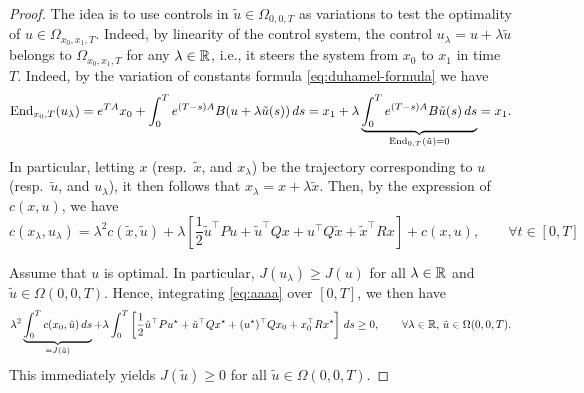 \begin{proof}
    The idea is to use controls in $\tilde u \in \Omega_{0,0,T}$ as variations to test the optimality of $u\in \Omega_{x_0,x_1,T}$.
    Indeed, by linearity of the control system, the control $u_\lambda = u + \lambda \tilde u$ belongs to $\Omega_{x_0,x_1,T}$ for any $\lambda\in \mathbb{R}$, i.e., it steers the system from $x_0$ to $x_1$ in time $T$.
    Indeed, by the variation of constants formula \eqref{eq:duhamel-formula} we have
    \begin{equation}
        \operatorname{End}_{x_0,T}(u_\lambda) = e^{TA}x_0 + \int_0^T e^{(T-s)A}B(u + \lambda \tilde u(s))\, ds = x_1 + \lambda \underbrace{\int_0^T e^{(T-s)A}B\tilde u(s)\, ds}_{\operatorname{End}_{0,T}(\tilde u)=0} = x_1.
    \end{equation}
    In particular, letting $x$ (resp.~$\tilde x$, and $x_\lambda$) be the trajectory corresponding to $u$ (resp.~$\tilde u$, and $u_\lambda$), it then follows that $x_\lambda = x + \lambda \tilde x$.
    Then, by the expression of $c(x,u)$, we have
    \begin{equation}
        \label{eq:aaaa}
        c(x_\lambda,u_\lambda)
        = \lambda^2 c(\tilde x, \tilde u) + \lambda \left[\frac12\tilde u^\top P u + \tilde u^\top Q x + u^\top Q \tilde x + \tilde x^\top Rx \right] + c(x, u),
        \qquad \forall t\in [0,T]
    \end{equation}
    
    Assume that $u$ is optimal. In particular, $J(u_\lambda)\ge J(u)$ for all $\lambda\in \mathbb{R}$ and $\tilde u\in \Omega(0,0,T)$. Hence, integrating \eqref{eq:aaaa} over $[0,T]$, we then have 
    \begin{equation}
       \lambda^2 \underbrace{\int_0^T c(x_0, \tilde u)\, ds}_{=J(\tilde u)} + \lambda \int_0^T \left[\frac12\tilde u^\top P u^\star + \tilde u^\top Q x^\star + (u^\star)^\top Q x_0 + x_0^\top Rx^\star \right] \, ds \ge 0, 
       \qquad \forall \lambda\in \mathbb{R}, \, \tilde u\in \Omega(0,0,T).
    \end{equation}
    This immediately yields $J(\tilde u)\ge 0$ for all $\tilde u\in \Omega(0,0,T)$.


\end{proof}
